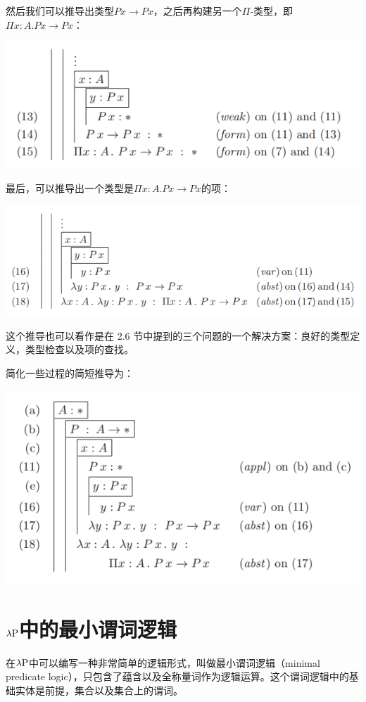 \documentclass[UTF8]{article}
\begin{document}
		然后我们可以推导出类型$Px\rightarrow Px$，之后再构建另一个$\Pi$-类型，即$\Pi x:A.Px\rightarrow Px$：
		
		\includegraphics[width=0.93\linewidth]{"../imgs/5-6.png"}
		
		最后，可以推导出一个类型是$\Pi x:A.Px\rightarrow Px$的项：
		
		\includegraphics[width=0.93\linewidth]{"../imgs/5-7.png"}
		
		这个推导也可以看作是在 2.6 节中提到的三个问题的一个解决方案：良好的类型定义，类型检查以及项的查找。
		
		简化一些过程的简短推导为：
		
		\includegraphics[width=0.93\linewidth]{"../imgs/5-8.png"}
		
	\section{$\lambda{\rm P}$中的最小谓词逻辑}
		在$\lambda{\rm P}$中可以编写一种非常简单的逻辑形式，叫做最小谓词逻辑（minimal predicate logic），只包含了蕴含以及全称量词作为逻辑运算。这个谓词逻辑中的基础实体是前提，集合以及集合上的谓词。
		
\end{document}
